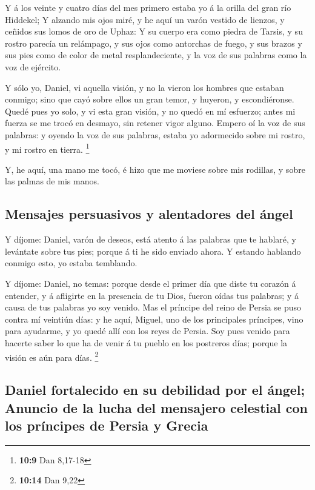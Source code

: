  Y á los veinte y cuatro días del mes primero estaba yo á
la orilla del gran río Hiddekel;  Y alzando mis ojos miré,
y he aquí un varón vestido de lienzos, y ceñidos sus lomos de oro de
Uphaz:  Y su cuerpo era como piedra de Tarsis, y su rostro
parecía un relámpago, y sus ojos como antorchas de fuego, y sus brazos y
sus pies como de color de metal resplandeciente, y la voz de sus
palabras como la voz de ejército.

 Y sólo yo, Daniel, vi aquella visión, y no la vieron los
hombres que estaban conmigo; sino que cayó sobre ellos un gran temor, y
huyeron, y escondiéronse.  Quedé pues yo solo, y vi esta
gran visión, y no quedó en mí esfuerzo; antes mi fuerza se me trocó en
desmayo, sin retener vigor alguno.  Empero oí la voz de
sus palabras: y oyendo la voz de sus palabras, estaba yo adormecido
sobre mi rostro, y mi rostro en tierra. \footnote{\textbf{10:9} Dan
  8,17-18}

 Y, he aquí, una mano me tocó, é hizo que me moviese
sobre mis rodillas, y sobre las palmas de mis manos.

\hypertarget{mensajes-persuasivos-y-alentadores-del-uxe1ngel}{%
\subsection{Mensajes persuasivos y alentadores del
ángel}\label{mensajes-persuasivos-y-alentadores-del-uxe1ngel}}

 Y díjome: Daniel, varón de deseos, está atento á las
palabras que te hablaré, y levántate sobre tus pies; porque á ti he sido
enviado ahora. Y estando hablando conmigo esto, yo estaba temblando.

 Y díjome: Daniel, no temas: porque desde el primer día
que diste tu corazón á entender, y á afligirte en la presencia de tu
Dios, fueron oídas tus palabras; y á causa de tus palabras yo soy
venido.  Mas el príncipe del reino de Persia se puso
contra mí veintiún días: y he aquí, Miguel, uno de los principales
príncipes, vino para ayudarme, y yo quedé allí con los reyes de Persia.
 Soy pues venido para hacerte saber lo que ha de venir á
tu pueblo en los postreros días; porque la visión es aún para días.
\footnote{\textbf{10:14} Dan 9,22}

\hypertarget{daniel-fortalecido-en-su-debilidad-por-el-uxe1ngel-anuncio-de-la-lucha-del-mensajero-celestial-con-los-pruxedncipes-de-persia-y-grecia}{%
\subsection{Daniel fortalecido en su debilidad por el ángel; Anuncio de
la lucha del mensajero celestial con los príncipes de Persia y
Grecia}\label{daniel-fortalecido-en-su-debilidad-por-el-uxe1ngel-anuncio-de-la-lucha-del-mensajero-celestial-con-los-pruxedncipes-de-persia-y-grecia}}


